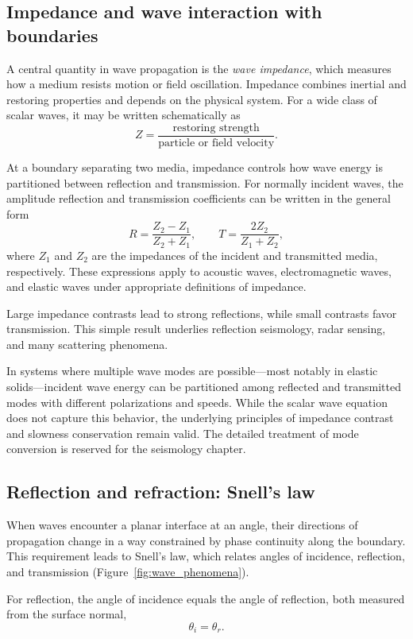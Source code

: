 \subsection{Impedance and wave interaction with boundaries}

A central quantity in wave propagation is the \emph{wave impedance}, which measures how a medium resists motion or field oscillation. Impedance combines inertial and restoring properties and depends on the physical system. For a wide class of scalar waves, it may be written schematically as
\[
    Z = \frac{\text{restoring strength}}{\text{particle or field velocity}}.
\]

At a boundary separating two media, impedance controls how wave energy is partitioned between reflection and transmission. For normally incident waves, the amplitude reflection and transmission coefficients can be written in the general form
\[
    R = \frac{Z_2 - Z_1}{Z_2 + Z_1}, \qquad
    T = \frac{2 Z_2}{Z_1 + Z_2},
\]
where $Z_1$ and $Z_2$ are the impedances of the incident and transmitted media, respectively. These expressions apply to acoustic waves, electromagnetic waves, and elastic waves under appropriate definitions of impedance.

Large impedance contrasts lead to strong reflections, while small contrasts favor transmission. This simple result underlies reflection seismology, radar sensing, and many scattering phenomena.

In systems where multiple wave modes are possible—most notably in elastic solids—incident wave energy can be partitioned among reflected and transmitted modes with different polarizations and speeds. While the scalar wave equation does not capture this behavior, the underlying principles of impedance contrast and slowness conservation remain valid. The detailed treatment of mode conversion is reserved for the seismology chapter.

\subsection{Reflection and refraction: Snell's law}

When waves encounter a planar interface at an angle, their directions of propagation change in a way constrained by phase continuity along the boundary.  This requirement leads to Snell's law, which relates angles of incidence, reflection, and transmission (Figure~\ref{fig:wave_phenomena}).


For reflection, the angle of incidence equals the angle of reflection, both
measured from the surface normal,
\[
    \theta_i = \theta_r .
\]

